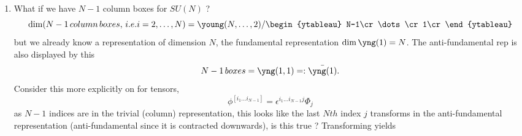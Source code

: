 \begin{enumerate}
\begin{mybox}{Trivial representation reduction scheme}
	The Levi-Civita tensor is an \emph{invariant tensor} under $SU(N)$, i.e.
	\begin{equation}
	\epsilon^{i_1 \dots i_8} \rightarrow U^{i_1}_{j_1} U^{i_2}_{j_2} \dots U^{i_8}_{j_8} \epsilon^{j_1 \dots j_8} = \det U \cdot \epsilon^{i_1 \dots i_8} = \epsilon^{i_1 \dots i_8}
	\end{equation}
	where the determinant comes into play due to the total antisymmtrization of the matrices and is equal to $1$ as we are considering $SU(N)$.\\
	Whenever you get a $N$ column structure for $SU(N)$, you can simply remove it from the representation, as it is a trivial representation simply given by the LV-tensor and has dimension $1$. Consider $SU(3)$ as an example
	\begin{equation}
	\young(abc,de,f) \rightarrow \young(bc,e),\qquad \dim \young(a,d,f) =1
	\end{equation}
	since the three indices $a,d,f$ are in the trivial representation and don't carry any info, neglect them and do the simpler case. Compare 
	\begin{equation}
	\dim= \young(345,23,1) / \young(531,31,1) = 8 \quad \rightarrow \quad \dim= \young(34,2) / \young(31,1) = 8,
	\end{equation}
	thus the same.
\end{mybox} 
\item What if we have $N-1$ column boxes for $SU(N)$ ?
\begin{equation}
\dim (N-1\, column\,boxes, \, i.e. i=2,\dots,N)=\young(N,\dots,2)/
\begin{ytableau}
N-1\cr
\dots\cr 
1\cr
\end{ytableau}
\end{equation}
but we already know a representation of dimension $N$, the fundamental representation $\dim \yng(1)=N$. The anti-fundamental rep is also displayed by this
\begin{equation}
N-1 \, boxes = \yng(1,1) =: \bar{\yng(1)}. 
\end{equation}
Consider this more explicitly on for tensors, 
\begin{equation}
\label{eq:fundamentalAntifundamentalreprelation}
\phi^{[i_1 \dots i_{N-1}]} = \epsilon^{i_1 \dots i_{N-1} j} \Phi_j
\end{equation}
as $N-1$ indices are in the trivial (column) representation, this looks like the last $Nth$ index $j$ transforms in the anti-fundamental representation (anti-fundamental since it is contracted downwards), is this true ? Transforming yields

\end{enumerate}

